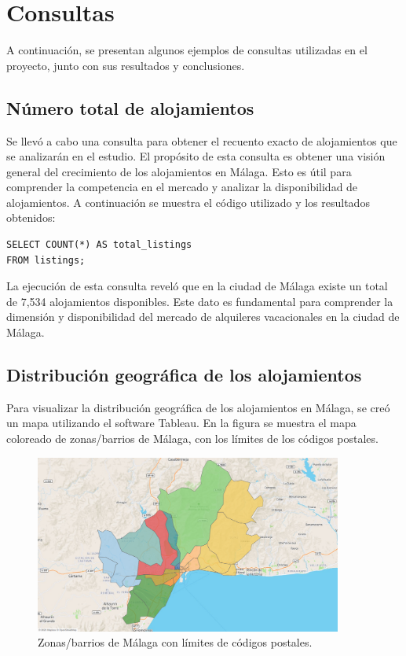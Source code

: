 \section{Consultas}

A continuación, se presentan algunos ejemplos de consultas utilizadas en el proyecto, junto con sus resultados y conclusiones.
\subsection{Número total de alojamientos}
Se llevó a cabo una consulta para obtener el recuento exacto de alojamientos que se analizarán en el estudio. El propósito de esta consulta es obtener una visión general del crecimiento de los alojamientos en Málaga.  Esto es útil para comprender la competencia en el mercado y analizar la disponibilidad de alojamientos. A continuación se muestra el código utilizado y los resultados obtenidos:

\begin{verbatim}
SELECT COUNT(*) AS total_listings
FROM listings;
\end{verbatim}

La ejecución de esta consulta reveló que en la ciudad de Málaga existe un total de 7,534 alojamientos disponibles. Este dato es fundamental para comprender la dimensión y disponibilidad del mercado de alquileres vacacionales en la ciudad de Málaga.

\subsection*{Distribución geográfica de los alojamientos}

Para visualizar la distribución geográfica de los alojamientos en Málaga, se creó un mapa utilizando el software Tableau. En la figura se muestra el mapa coloreado de zonas/barrios de Málaga, con los límites de los códigos postales.

\begin{figure}[h]
    \centering
    \includegraphics[width=0.9\textwidth]{capturas/1.png}
    \caption{Zonas/barrios de Málaga con límites de códigos postales.}
    \label{fig:mapa-malaga} %
\end{figure}




